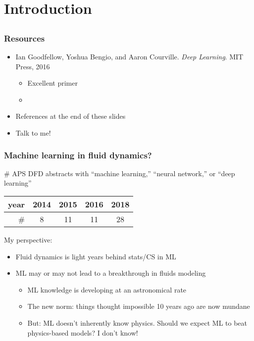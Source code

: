 \section{Introduction}

\subsection{}

\begin{frame}
    \frametitle{Resources}

    \begin{itemize}
        \item Ian Goodfellow, Yoshua Bengio, and Aaron Courville.
        \emph{Deep Learning}.
        MIT Press, 2016
        \nocite{GoodfellowDL}
        \begin{itemize}
            \item Excellent primer
            \item {}
        \end{itemize}
        \item References at the end of these slides
        \item Talk to me! \smiley
    \end{itemize}
\end{frame}

\begin{frame}
    \frametitle{Machine learning in fluid dynamics?}
    \# APS DFD abstracts with ``machine learning,'' ``neural network,'' or ``deep learning''

    \begin{center}
        \begin{tabular}{r|cccc}
            year & 2014 & 2015 & 2016 & 2018 \\
            \hline
            \# & 8 & 11 & 11 & \alert{28}
        \end{tabular}
    \end{center}

    My perspective:

    \begin{itemize}
        \item Fluid dynamics is light years behind stats/CS in ML
        \item ML may or may not lead to a breakthrough in fluids modeling
        \begin{itemize}
            \item ML knowledge is developing at an astronomical rate
            \item The new norm: things thought impossible 10 years ago are now mundane
            \item But: ML doesn't inherently know physics.
            Should we expect ML to beat physics-based models?
            I don't know!
        \end{itemize}
    \end{itemize}
\end{frame}

